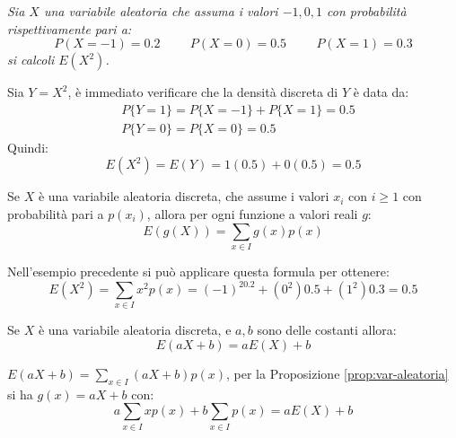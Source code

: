 \begin{Example}{}{}
    \textit{Sia $X$ una variabile aleatoria che assuma i valori $-1,0,1$ con probabilità rispettivamente pari a:}
    \begin{equation*}
        P(X=-1)=0.2\hspace{1cm}P(X=0)=0.5\hspace{1cm}P(X=1)=0.3
    \end{equation*}
    \textit{si calcoli $E(X^2)$.}

    Sia $Y = X^2$, è immediato verificare che la densità discreta di $Y$ è data da:
    \begin{align*}
        &P\{Y = 1\} = P\{X = -1\} + P\{X = 1\} = 0.5\\
        &P\{Y = 0\} = P\{X = 0\} = 0.5
    \end{align*}
    Quindi:
    \begin{equation*}
        E(X^2) = E(Y) = 1(0.5) + 0(0.5) = 0.5 
    \end{equation*}
\end{Example}

\begin{Proposition}{}{}\label{prop:var-aleatoria}
    Se $X$ è una variabile aleatoria discreta, che assume i valori $x_i$ con $i\geq1$ con probabilità pari a $p(x_i)$, allora per ogni funzione a valori reali $g$:
    \begin{equation*}
        E(g(X))=\sum_{x\in I}g(x)p(x)
    \end{equation*}
    \begin{example}
        Nell'esempio precedente si può applicare questa formula per ottenere:
        \begin{equation*}
            E(X^2)=\sum_{x\in I}x^2p(x)=(-1)^20.2+(0^2)0.5+(1^2)0.3=0.5
        \end{equation*}
    \end{example}
\end{Proposition}

\begin{Corollario}{}{}\label{cor:var-aleatorie}
    Se $X$ è una variabile aleatoria discreta, e $a,b$ sono delle costanti allora:
    \begin{equation*}
        E(aX+b)=aE(X)+b
    \end{equation*}
    \begin{demonstration}
        $E(aX+b)=\sum_{x\in I}(aX+b)p(x)$, per la Proposizione \ref{prop:var-aleatoria} si ha $g(x)=aX+b$ con:
        \begin{equation*}
            a\sum_{x\in I}xp(x)+b\sum_{x\in I}p(x)=aE(X)+b
        \end{equation*}
    \end{demonstration}
\end{Corollario}


